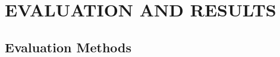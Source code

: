 %
%
%
%
%
%











\section{EVALUATION AND RESULTS}
\label{chap:evalution}

\subsection{Evaluation Methods}

